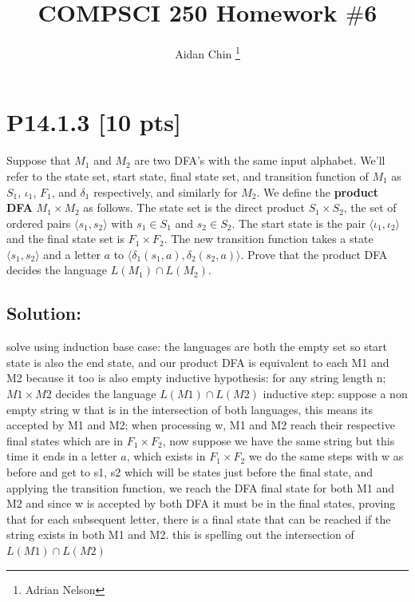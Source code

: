 \documentclass[12pt]{article}
\title{COMPSCI 250 Homework $\#$6}
\author{Aidan Chin \footnote{Adrian Nelson}}
\begin{document}
\maketitle

\section*{\textbf{P14.1.3} [10 pts]}
Suppose that $M_1$ and $M_2$ are two DFA’s with the same input alphabet. We’ll refer to the state set, start state, final state set, and transition function of $M_1$ as $S_1$, $\iota_1$, $F_1$, and $\delta_1$ respectively, and similarly for $M_2$. We define the \textbf{product DFA} $M_1 \times M_2$ as follows. The state set is the direct product $S_1 \times S_2$, the set of ordered pairs $\langle s_1, s_2 \rangle$ with $s_1 \in S_1$ and $s_2 \in S_2$. The start state is the pair $\langle \iota_1, \iota_2 \rangle$ and the final state set is $F_1 \times F_2$. The new transition function takes a state $\langle s_1, s_2 \rangle$ and a letter $a$ to $\langle \delta_1(s_1, a), \delta_2(s_2, a)\rangle$. Prove that the product DFA decides the language $L(M_1) \cap L(M_2)$.

\subsection*{\textbf{Solution:}}

solve using induction\newline
base case: the languages are both the empty set so start state is also the end state, and our product DFA is equivalent to each M1 and M2 because it too is also empty\newline
inductive hypothesis: for any string length n; $M1 \times M2$ decides the language $L(M1)\cap L(M2)$\newline
inductive step: suppose a non empty string w that is in the intersection of both languages, this means its accepted by M1 and M2; when processing w, M1 and M2 reach their respective final states which are in $F_1 \times F_2$, now suppose we have the same string but this time it ends in a letter $a$, which exists in $F_1\times F_2$ we do the same steps with w as before and get to s1, s2 which will be states just before the final state, and applying the transition function, we reach the DFA final state for both M1 and M2 and since w is accepted by both DFA it must be in the final states, proving that for each subsequent letter, there is a final state that can be reached if the string exists in both M1 and M2. this is spelling out the intersection of $L(M1)\cap L(M2)$
\end{document}
